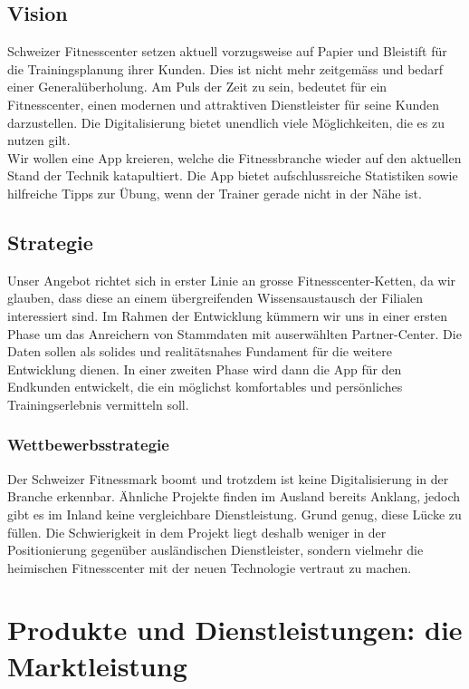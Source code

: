 \subsection{Vision}
Schweizer Fitnesscenter setzen aktuell vorzugsweise auf Papier und Bleistift für die Trainingsplanung ihrer Kunden. Dies ist nicht mehr zeitgemäss und bedarf einer Generalüberholung. Am Puls der Zeit zu sein, bedeutet für ein Fitnesscenter, einen modernen und attraktiven Dienstleister für seine Kunden darzustellen. Die Digitalisierung bietet unendlich viele Möglichkeiten, die es zu nutzen gilt. \\
Wir wollen eine App kreieren, welche die Fitnessbranche wieder auf den aktuellen Stand der Technik katapultiert. Die App bietet aufschlussreiche Statistiken sowie hilfreiche Tipps zur Übung, wenn der Trainer gerade nicht in der Nähe ist.

\subsection{Strategie}
Unser Angebot richtet sich in erster Linie an grosse Fitnesscenter-Ketten, da wir glauben, dass diese an einem übergreifenden Wissensaustausch der Filialen interessiert sind. Im Rahmen der Entwicklung kümmern wir uns in einer ersten Phase um das Anreichern von Stammdaten mit auserwählten Partner-Center. Die Daten sollen als solides und realitätsnahes Fundament für die weitere Entwicklung dienen. In einer zweiten Phase wird dann die App für den Endkunden entwickelt, die ein möglichst komfortables und persönliches Trainingserlebnis vermitteln soll. 

\subsubsection{Wettbewerbsstrategie}
Der Schweizer Fitnessmark boomt und trotzdem ist keine Digitalisierung in der Branche erkennbar. Ähnliche Projekte finden im Ausland bereits Anklang, jedoch gibt es im Inland keine vergleichbare Dienstleistung. Grund genug, diese Lücke zu füllen. Die Schwierigkeit in dem Projekt liegt deshalb weniger in der Positionierung gegenüber ausländischen Dienstleister, sondern vielmehr die heimischen Fitnesscenter mit der neuen Technologie vertraut zu machen.


\clearpage
\section{Produkte und Dienstleistungen: die Marktleistung}

